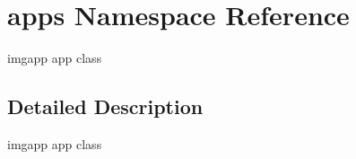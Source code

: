 \hypertarget{namespaceapps}{}\section{apps Namespace Reference}
\label{namespaceapps}


imgapp app class  




\subsection{Detailed Description}
imgapp app class 